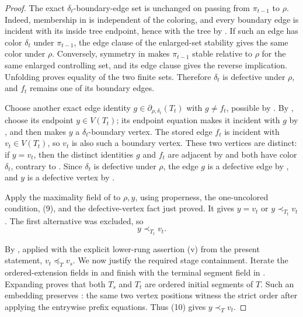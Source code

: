 \begin{proof}
The exact \(\delta_t\)-boundary-edge set is unchanged on passing from
\(\pi_{t-1}\) to \(\rho\).  Indeed, membership in
 is independent of the coloring, and every
boundary edge is incident with its inside tree endpoint, hence with the
tree by .  If such an edge has color
\(\delta_t\) under \(\pi_{t-1}\), the edge clause of the enlarged-set
stability gives the same color under \(\rho\).  Conversely, symmetry in
 makes \(\pi_{t-1}\) stable relative to \(\rho\) for the
same enlarged controlling set, and its edge clause gives the reverse
implication.  Unfolding  proves equality of
the two finite sets.  Therefore \(\delta_t\) is defective under \(\rho\),
and \(f_t\) remains one of its boundary edges.

Choose another exact edge identity
\(g\in\partial_{\rho,\delta_t}(T_t)\) with \(g\ne f_t\), possible by
.  By , choose its endpoint
\(y\in V(T_t)\); its endpoint equation makes it incident with \(g\) by
, and then  makes \(y\) a
\(\delta_t\)-boundary vertex.  The stored edge \(f_t\) is incident with
\(v_t\in V(T_t)\), so \(v_t\) is also such a boundary vertex.  These two
vertices are distinct: if \(y=v_t\), then the distinct identities \(g\)
and \(f_t\) are adjacent by  and both have color
\(\delta_t\), contrary to .  Since
\(\delta_t\) is defective under \(\rho\), the edge \(g\) is a defective
edge by , and \(y\) is a defective vertex by
.

Apply the maximality field of  to
\(\rho,y\), using properness, the one-uncolored condition, (9), and the
defective-vertex fact just proved.  It gives \(y=v_t\) or
\(y\prec_{T_t}v_t\).  The first alternative was excluded, so
\[
                              y\prec_{T_t}v_t.                  \tag{10}
\]

By , applied with the explicit
lower-rung assertion (v) from the present statement,
\(v_t\preceq_Tv_s\).  We now justify the required stage containment.
Iterate the ordered-extension fields in 
and finish with the terminal segment field in
.  Expanding
 proves that both \(T_s\) and \(T_t\)
are ordered initial segments of \(T\).  Such an embedding preserves
: the same two vertex positions witness the
strict order after applying the entrywise prefix equations.  Thus (10)
gives \(y\prec_Tv_t\).


\end{proof}
